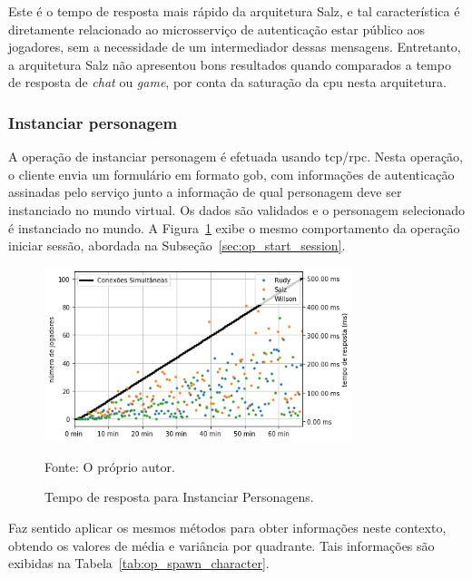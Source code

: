 \vspace{-0.3cm}
Este é o tempo de resposta mais rápido da arquitetura Salz, e tal característica é diretamente relacionado ao microsserviço de autenticação estar público aos jogadores, sem a necessidade de um intermediador dessas mensagens.
%
Entretanto, a arquitetura Salz não apresentou bons resultados quando comparados a tempo de resposta de \textit{chat} ou \textit{game}, por conta da saturação da \ac{cpu} nesta arquitetura.

\subsubsection{Instanciar personagem}

A operação de instanciar personagem é efetuada usando \ac{tcp}/\ac{rpc}.
%
Nesta operação, o cliente envia um formulário em formato \ac{gob}, com informações de autenticação assinadas pelo serviço junto a informação de qual personagem deve ser instanciado no mundo virtual.
%
Os dados são validados e o personagem selecionado é instanciado no mundo.
%
A Figura~\ref{fig:spawn_character_request_time} exibe o mesmo comportamento da operação iniciar sessão, abordada na Subseção~\ref{sec:op_start_session}.
%


\begin{figure}[htb!]
  \caption{Tempo de resposta para Instanciar Personagens.}
  \vspace{-0.3cm}
  \label{fig:spawn_character_request_time}
  \includegraphics[width=0.8\textwidth]{figuras/analise/rt/spawn_character_request_time.png}
  \centering

  \vspace{-0.3cm}
  Fonte: O próprio autor.
\end{figure}

Faz sentido aplicar os mesmos métodos para obter informações neste contexto, obtendo os valores de média e variância por quadrante.
%
Tais informações são exibidas na Tabela~\ref{tab:op_spawn_character}.

